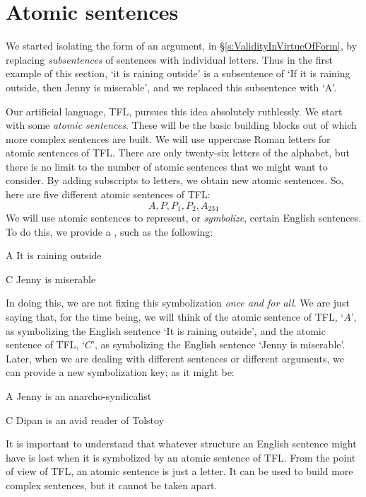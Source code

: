 \section{Atomic sentences}

We started isolating the form of an argument, in \S\ref{s:ValidityInVirtueOfForm}, by replacing  \emph{subsentences} of sentences with individual letters. Thus in the first example of this section, `it is raining outside' is a subsentence of `If it is raining outside, then Jenny is miserable', and we replaced this subsentence with `A'. 

Our artificial language, TFL, pursues this idea absolutely ruthlessly. We start with some \emph{atomic sentences}. These will be the basic building blocks out of which more complex sentences are built. We will use uppercase Roman letters for atomic sentences of TFL. There are only twenty-six letters of the alphabet, but there is no limit to the number of atomic sentences that we might want to consider. By adding subscripts to letters, we obtain new atomic sentences. So, here are five different atomic sentences of TFL:
	$$A, P, P_1, P_2, A_{234}$$
We will use atomic sentences to represent, or \emph{symbolize}, certain English sentences. To do this, we provide a , such as the following:
	\begin{ekey}
		\item[A] It is raining outside
		\item[C] Jenny is miserable
	\end{ekey}
In doing this, we are not fixing this symbolization \emph{once and for all}. We are just saying that, for the time being, we will think of the atomic sentence of TFL, `$A$', as symbolizing the English sentence `It is raining outside', and the atomic sentence of TFL, `$C$', as symbolizing the English sentence `Jenny is miserable'. Later, when we are dealing with different sentences or different arguments, we can provide a new symbolization key; as it might be:
	\begin{ekey}
		\item[A] Jenny is an anarcho-syndicalist
		\item[C] Dipan is an avid reader of Tolstoy
	\end{ekey}
It is important to understand that whatever structure an English sentence might have is lost when it is symbolized by an atomic sentence of TFL. From the point of view of TFL, an atomic sentence is just a letter. It can be used to build more complex sentences, but it cannot be taken apart.

